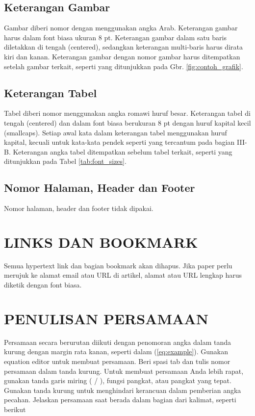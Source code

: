 \documentclass[10pt,twocolumn]{article}
\begin{document}
\subsection{Keterangan Gambar}
Gambar diberi nomor dengan menggunakan angka Arab. Keterangan gambar harus dalam font biasa ukuran 8 pt. Keterangan gambar dalam satu baris diletakkan di tengah (centered), sedangkan keterangan multi-baris harus dirata kiri dan kanan. Keterangan gambar dengan nomor gambar harus ditempatkan setelah gambar terkait, seperti yang ditunjukkan pada Gbr. \ref{fig:contoh_grafik}.

\subsection{Keterangan Tabel}
Tabel diberi nomor menggunakan angka romawi huruf besar. Keterangan tabel di tengah (centered) dan dalam font biasa berukuran 8 pt dengan huruf kapital kecil (smallcaps). Setiap awal kata dalam keterangan tabel menggunakan huruf kapital, kecuali untuk kata-kata pendek seperti yang tercantum pada bagian III-B. Keterangan angka tabel ditempatkan sebelum tabel terkait, seperti yang ditunjukkan pada Tabel \ref{tab:font_sizes}.

\subsection{Nomor Halaman, Header dan Footer}
Nomor halaman, header dan footer tidak dipakai.

\section{\MakeUppercase{Links dan Bookmark}}
Semua hypertext link dan bagian bookmark akan dihapus. Jika paper perlu merujuk ke alamat email atau URL di artikel, alamat atau URL lengkap harus diketik dengan font biasa.

\section{\MakeUppercase{Penulisan Persamaan}}
Persamaan secara berurutan diikuti dengan penomoran angka dalam tanda kurung dengan margin rata kanan, seperti dalam (\ref{eq:example}). Gunakan equation editor untuk membuat persamaan. Beri spasi tab dan tulis nomor persamaan dalam tanda kurung. Untuk membuat persamaan Anda lebih rapat, gunakan tanda garis miring ( / ), fungsi pangkat, atau pangkat yang tepat. Gunakan tanda kurung untuk menghindari kerancuan dalam pemberian angka pecahan. Jelaskan persamaan saat berada dalam bagian dari kalimat, seperti berikut
\end{document}
